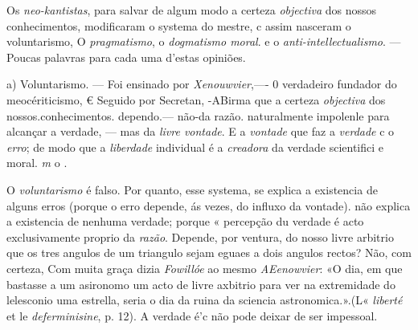 Os \emph{neo-kantistas}, para salvar de algum modo a certeza \emph{objectiva} dos nossos conhecimentos, modificaram o systema do mestre, c assim nasceram o voluntarismo, O \emph{pragmatismo}, o \emph{dogmatismo moral}. e o \emph{anti-intellectualismo}. --- Poucas palavras para cada uma d'estas opiniões.

a) Voluntarismo. --- Foi ensinado por \emph{Xenouwvier},---- 0 verdadeiro fundador do meocériticismo, € Seguido por Secretan, -ABirma que a certeza \emph{objectiva} dos nossos.conhecimentos. dependo.--- não-da razão. naturalmente impolenle para alcançar a verdade, --- mas da \emph{livre vontade}. E a \emph{vontade} que faz a \emph{verdade} c o \emph{erro}; de modo que a \emph{liberdade} individual é a \emph{creadora} da verdade scientifici e moral. \emph{m} o .

O \emph{voluntarismo} é falso. Por quanto, esse systema, se explica a existencia de alguns erros (porque o erro depende, ás vezes, do influxo da vontade). não explica a existencia de nenhuma verdade; porque « percepção du verdade é acto exclusivamente proprio da \emph{razão}. Depende, por ventura, do nosso livre arbitrio que os tres angulos de um triangulo sejam eguaes a dois angulos rectos? Não, com certeza, Com muita graça dizia \emph{Fowillóe} ao mesmo \emph{AEenowvier}: «O dia, em que bastasse a um asironomo um acto de livre axbitrio para ver na extremidade do lelesconio uma estrella, seria o dia da ruina da sciencia astronomica.».(L« \emph{liberté} et le \emph{deferminisine}, p. 12). A verdade é'c não pode deixar de ser impessoal.

